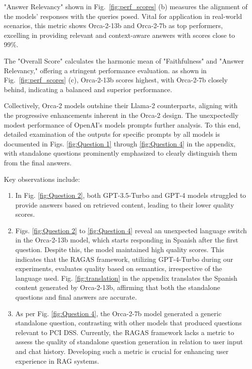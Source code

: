 \documentclass[runningheads]{llncs}
\begin{document}
"Answer Relevancy" shown in  Fig.~\ref{fig:perf_scores} (b) measures the alignment of the models' responses with the queries posed. Vital for application in real-world scenarios, this metric shows Orca-2-13b and Orca-2-7b as top performers, excelling in providing relevant and context-aware answers with scores close to 99\%.

The "Overall Score" calculates the harmonic mean of "Faithfulness" and "Answer Relevancy," offering a stringent performance evaluation. as shown in   Fig.~\ref{fig:perf_scores} (c), Orca-2-13b scores highest, with Orca-2-7b closely behind, indicating a balanced and superior performance.

Collectively, Orca-2 models outshine their Llama-2 counterparts, aligning with the progressive enhancements inherent in the Orca-2 design. The unexpectedly modest performance of OpenAI's models prompts further analysis. To this end, detailed examination of the outputs for specific prompts by all models is documented in Figs. \ref{fig:Question 1} through \ref{fig:Question 4} in the appendix, with standalone questions prominently emphasized to clearly distinguish them from the final answers.

Key observations include:

\begin{enumerate}
    \item In Fig. \ref{fig:Question 2}, both GPT-3.5-Turbo and GPT-4 models struggled to provide answers based on retrieved content, leading to their lower quality scores.


    \item Figs. \ref{fig:Question 2} to \ref{fig:Question 4} reveal an unexpected language switch in the Orca-2-13b model, which starts responding in Spanish after the first question. Despite this, the model maintained high quality scores. This indicates that the RAGAS framework, utilizing GPT-4-Turbo during our experiments, evaluates quality based on semantics, irrespective of the language used. Fig. \ref{fig:translation} in the appendix translates the Spanish content generated by Orca-2-13b, affirming that both the standalone questions and final answers are accurate.

    \item As per Fig. \ref{fig:Question 4}, the Orca-2-7b model generated a generic standalone question, contrasting with other models that produced questions relevant to PCI DSS. Currently, the RAGAS framework lacks a metric to assess the quality of standalone question generation in relation to user input and chat history. Developing such a metric is crucial for enhancing user experience in RAG systems.

\end{enumerate}
\end{document}
